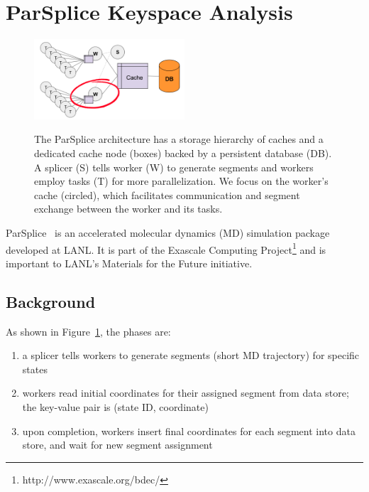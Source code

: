 \section{ParSplice Keyspace Analysis}
\label{sec:parsplice-keyspace-analysis}

\begin{figure}[t]
\noindent\includegraphics[width=0.5\textwidth]{figures/parsplice.png}\\
\caption{The ParSplice architecture has a storage hierarchy of caches and a
dedicated cache node (boxes) backed by a persistent database (DB). A splicer
(S) tells worker (W) to generate segments and workers employ tasks (T) for more
parallelization. We focus on the worker's cache (circled), which facilitates
communication and segment exchange between the worker and its tasks.
\label{fig:parsplice}}
\end{figure}

ParSplice~\cite{perez:jctc20150parsplice} is an accelerated molecular dynamics
(MD) simulation package developed at LANL. It is part of the Exascale Computing
Project\footnote{http://www.exascale.org/bdec/} and is important to LANL's
Materials for the Future initiative. 

\subsection{Background}

As shown in Figure~\ref{fig:parsplice}, the phases are:

\begin{enumerate}

  \item a splicer tells workers to generate segments (short MD trajectory) for
  specific states

  \item workers read initial coordinates for their assigned segment from data
  store; the key-value pair is (state ID, coordinate)

  \item upon completion, workers insert final coordinates for each segment into
  data store, and wait for new segment assignment

\end{enumerate}


